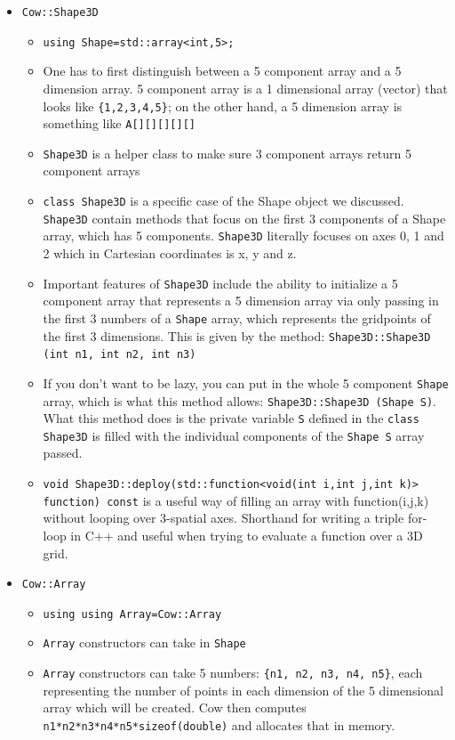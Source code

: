 \documentclass{article}
\begin{document}
\begin{itemize}
	\item \texttt{Cow::Shape3D}
	\begin{itemize}
		\item \texttt{using Shape=std::array<int,5>;} 
		\item One has to first distinguish between a 5 component array and a 5 dimension array. 5 component array is a 1 dimensional array (vector) that looks like \texttt{\{1,2,3,4,5\}}; on the other hand, a 5 dimension array is something like \texttt{A[][][][][]}
		\item \texttt{Shape3D} is a helper class to make sure 3 component arrays return 5 component arrays
		\item \texttt{class Shape3D} is a specific case of the Shape object we discussed. \texttt{Shape3D} contain methods that focus on the first 3 components of a Shape array, which has 5 components. \texttt{Shape3D} literally focuses on axes 0, 1 and 2 which in Cartesian coordinates is x, y and z. 
		\item Important features of \texttt{Shape3D} include the ability to initialize a 5 component array that represents a 5 dimension array via only passing in the first 3 numbers of a \texttt{Shape} array, which represents the gridpoints of the first 3 dimensions. This is given by the method: \texttt{Shape3D::Shape3D (int n1, int n2, int n3)}
		\item If you don't want to be lazy, you can put in the whole 5 component \texttt{Shape} array, which is what this method allows: \texttt{Shape3D::Shape3D (Shape S)}. What this method does is the private variable \texttt{S} defined in the \texttt{class Shape3D} is filled with the individual components of the \texttt{Shape S} array passed.	
		\item \texttt{void Shape3D::deploy(std::function<void(int i,int j,int k)> function) const} is a useful way of filling an array with function(i,j,k) without looping over 3-spatial axes. Shorthand for writing a triple for-loop in C++ and useful when trying to evaluate a function over a 3D grid.
	\end{itemize}
	\item \texttt{Cow::Array}
	\begin{itemize}
		\item \texttt{using using Array=Cow::Array}
		\item \texttt{Array} constructors can take in \texttt{Shape}
		\item \texttt{Array} constructors can take 5 numbers: \texttt{\{n1, n2, n3, n4, n5\}}, each representing the number of points in each dimension of the 5 dimensional array which will be created. Cow then computes \texttt{n1*n2*n3*n4*n5*sizeof(double)} and allocates that in memory.

\end{itemize}
\end{itemize}
\end{document}
